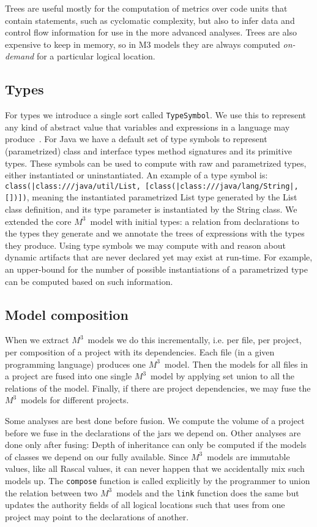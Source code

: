 \documentclass[conference]{IEEEtran}
\newcommand{\loc}[1]{\small{\texttt{#1}}\xspace}
\newcommand{\mthree}{\ensuremath{M^3}\xspace}
\begin{document}
Trees are useful mostly for the computation of metrics over code units that
contain statements, such as cyclomatic complexity, but also to infer data and
control flow information for use in the more advanced analyses. Trees are also
expensive to keep in memory, so in M3 models they are always computed \emph
{on-demand} for a particular logical location.

\subsection{Types} For types we introduce a single sort called
\texttt{TypeSymbol}. We use this to represent any kind of abstract value that
variables and expressions in a language may produce~\cite{abstractinterpretation}. For Java we have a
default set of type symbols to represent (parametrized) class and interface
types method signatures and its primitive types. These symbols can be used to
compute with raw and parametrized types, either instantiated or
uninstantiated. An example of a type symbol is:
\loc{class(|class:///java/util/List, [class(|class:///java/lang/String|,[])])}, meaning the instantiated
parametrized List type generated by the List class definition, and its type
parameter is instantiated by the String class. We extended the core \mthree\
model with initial types: a relation from declarations to the types they
generate and we annotate the trees of expressions with the types they produce.
Using type symbols we may compute with and reason about dynamic artifacts that
are never declared yet may exist at run-time. For example, an upper-bound for the
number of possible instantiations of a parametrized type can be computed based
on such information.

\subsection{Model composition} When we extract \mthree\  models we do this
incrementally, i.e. per file, per project, per composition of a project with
its dependencies. Each file (in a given programming language) produces one
\mthree\  model. Then the models for all files in a project are fused into one
single \mthree\  model by applying set union to all the relations of the
model. Finally, if there are project dependencies, we may fuse the \mthree\
models for different projects.

Some analyses are best done before fusion. We compute the volume of a project
before we fuse in the declarations of the jars we depend on. Other analyses
are done only after fusing: Depth of inheritance can only be computed if the
models of classes we depend on our fully available. Since \mthree\  models are
immutable values, like all Rascal values, it can never happen that we
accidentally mix such models up. The \texttt{compose} function is called
explicitly by the programmer to union the relation between two \mthree\ models
and the \texttt{link} function does the same but updates the authority fields
of all logical locations such that uses from one project may point to the
declarations of another.
\end{document}
